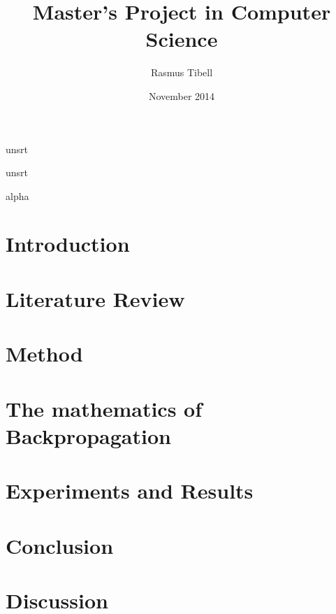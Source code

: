 \documentclass[a4paper]{article}
\title{Master's Project in Computer Science}
\author{Rasmus Tibell}
\date{November 2014}
\begin{document}

{unsrt} 

{unsrt} 

{alpha} 

\maketitle

\pagebreak
\tableofcontents


\pagebreak
\section{Introduction}



\pagebreak
\section{Literature Review} \label{ss:literature_review}



\pagebreak
\section{Method}



\pagebreak
\section{The mathematics of Backpropagation}



\section{Experiments and Results} \label{ss:results}

 


\section{Conclusion}




\section{Discussion}

\end{document}
